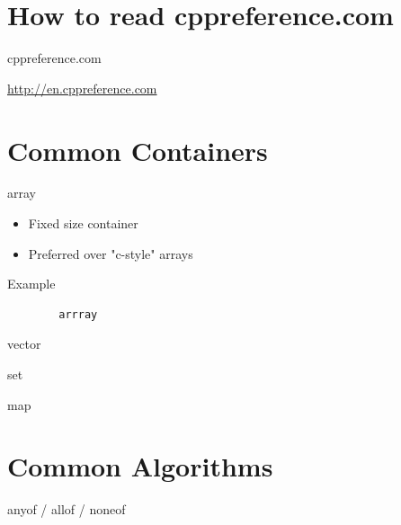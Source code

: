 \documentclass[notes]{beamer}
\begin{document}
\section{How to read cppreference.com}

\begin{frame}{cppreference.com}
	\begin{center}
		\url{http://en.cppreference.com}
	\end{center}
\end{frame}


\section{Common Containers}

\begin{frame}{array}
	\begin{itemize}
		\item Fixed size container
		\item Preferred over "c-style" arrays
	\end{itemize}
	\begin{exampleblock}{Example}
	\begin{verbatim}
		arrray
	\end{verbatim}
	\end{exampleblock}
\end{frame}

\begin{frame}{vector}

\end{frame}

\begin{frame}{set}

\end{frame}

\begin{frame}{map}

\end{frame}

\section{Common Algorithms}

\begin{frame}{any\textunderscore of / all\textunderscore of / none\textunderscore of}

\end{frame}
\end{document}
